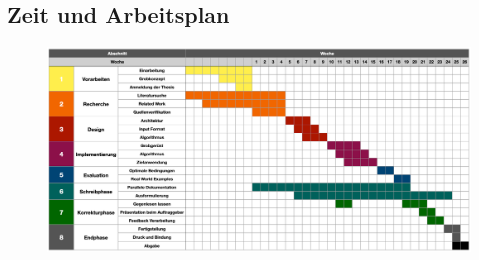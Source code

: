 \begin{landscape}

\chapter{Zeit und Arbeitsplan}

\begin{figure}
	\centering
	\includegraphics[trim=0 0 0 0, scale=0.3]{pics/Zeitplan}
\end{figure}

\end{landscape}